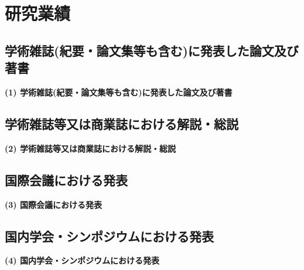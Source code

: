 \section{研究業績}





\vspace*{70mm}

\subsection{学術雑誌(紀要・論文集等も含む)に発表した論文及び著書}
	\noindent
	{\bf (1) 学術雑誌(紀要・論文集等も含む)に発表した論文及び著書}
{%
}%

\subsection{学術雑誌等又は商業誌における解説・総説}
	\noindent
	{\bf (2) 学術雑誌等又は商業誌における解説・総説}
{%
}%

\subsection{国際会議における発表}
	\noindent
	{\bf (3) 国際会議における発表}
{%
}%

\subsection{国内学会・シンポジウムにおける発表}
	\noindent
	{\bf (4) 国内学会・シンポジウムにおける発表}
{%
}%

